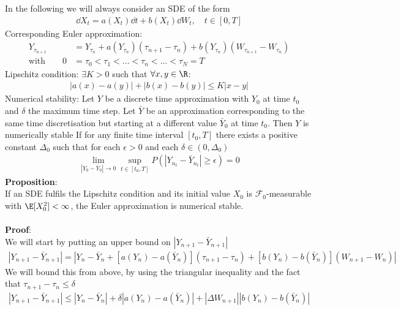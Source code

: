 In the following we will always consider an SDE of the form
\begin{align}
\dd X_t = a(X_t)\dd t + b(X_t) \dd W_t, \quad t\in[0,T]
\end{align}
Corresponding Euler approximation:
\begin{align}
Y_{\tau_{n+1}}&= Y_{\tau_{n}}+a(Y_{\tau_{n}})(\tau_{n+1}-\tau_{n})+b(Y_{\tau_{n}})(W_{\tau_{n+1}}-W_{\tau_{n}}) \label{eq:Euler_approx}\\
\text{with}\qquad0 &= \tau_{0}<\tau_{1}<...<\tau_{n}<...<\tau_{N} = T
\end{align}
Lipschitz condition: $\exists K>0$ such that $\forall x,y \in \R$: 
\begin{align}
|a(x)-a(y)|+|b(x)-b(y)|\leq K|x-y|\label{eq:Lip_cond}
\end{align}
Numerical stability: Let $Y$ be a discrete time approximation with $Y_0$ at time $t_0$ and $\delta$ the maximum time step. Let $\bar{Y}$ be an approximation corresponding to the same time discretisation but starting at a different value $\bar{Y}_0$ at time $t_0$. Then $Y$ is numerically stable If for any finite  time interval $[t_0,T]$ there exists a positive constant $\Delta_0$ such that for each $\epsilon>0$ and each $\delta \in (0,\Delta_0)$
\begin{align}
\lim_{|Y_0-\bar{Y}_0|\rightarrow 0}\sup_{t\in[t_0,T]} P\left(|Y_{n_t}-\bar{Y}_{n_t}|\geq \epsilon\right) =0
\end{align}
\textbf{Proposition}: \\
If an SDE fulfils the Lipschitz condition and its initial value $X_0$ is $\mathscr{F}_0$-measurable with $\E[X_0^2]<\infty$, the Euler approximation is numerical stable.\\ \\
\textbf{Proof}:\\
We will start by putting an upper bound on $\left|Y_{n+1}-\bar{Y}_{n+1}\right|$
\begin{align}
\left|Y_{n+1}-\bar{Y}_{n+1}\right| = \left|Y_n-\bar{Y}_{n}+[a(Y_n)-a(\bar{Y}_n)](\tau_{n+1}-\tau_n) +[b(Y_n)-b(\bar{Y}_n)](W_{n+1}-W_n)\right|
\end{align}
We will bound this from above, by using the triangular inequality and the fact that $\tau_{n+1}-\tau_n\leq \delta$
\begin{align}
\left|Y_{n+1}-\bar{Y}_{n+1}\right| \leq  \left|Y_n-\bar{Y}_{n}\right|+\delta\left|a(Y_n)-a(\bar{Y}_n)\right| +\left|\Delta W_{n+1}\right|\left|b(Y_n)-b(\bar{Y}_n)\right|
\end{align}

